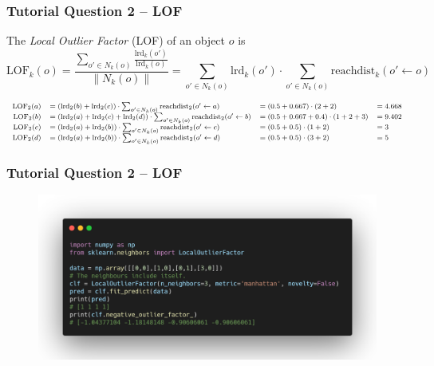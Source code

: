 \documentclass[aspectratio=169, 10pt]{beamer}
\newcommand{\norm}[1]{\left\lVert#1\right\rVert}
\begin{document}
\begin{frame}[t]
    \frametitle{Tutorial Question 2 -- LOF}
    
    The {\em Local Outlier Factor} (LOF) of an object $o$ is
    \[
        \text{LOF}_k(o) = \frac{\sum_{o' \in N_k(o)} \frac{\text{lrd}_k(o')}{\text{lrd}_k(o)}}{\norm{N_k(o)}} 
        = \sum_{o' \in N_k(o)} \text{lrd}_k(o') \cdot \sum_{o' \in N_k(o)} \text{reachdist}_k(o' \leftarrow o)
        \]
        
        \begin{equation*}
        \footnotesize
        \begin{array}{rlll}
            \text{LOF}_2(a) & = (\text{lrd}_2(b) + \text{lrd}_2(c)) \cdot \sum_{o' \in N_k(o)} \text{reachdist}_2(o' \leftarrow a) & = (0.5+0.667)\cdot (2+2)& = 4.668\\
            \text{LOF}_2(b) & = (\text{lrd}_2(a) + \text{lrd}_2(c) + \text{lrd}_2(d)) \cdot \sum_{o' \in N_k(o)} \text{reachdist}_2(o' \leftarrow b) & = (0.5+0.667+0.4) \cdot (1+2+3)& = 9.402\\
            \text{LOF}_2(c) & = (\text{lrd}_2(a) + \text{lrd}_2(b)) \cdot \sum_{o' \in N_k(o)} \text{reachdist}_2(o' \leftarrow c) & = (0.5+0.5) \cdot (1+2)& = 3 \\
            \text{LOF}_2(d) & = (\text{lrd}_2(a) + \text{lrd}_2(b)) \cdot \sum_{o' \in N_k(o)} \text{reachdist}_2(o' \leftarrow d) & = (0.5+0.5) \cdot (3+2)& = 5 \\
        \end{array}
    \end{equation*}

\end{frame}

\begin{frame}
    \frametitle{Tutorial Question 2 -- LOF}
    
    \begin{figure}
        \centering
        \includegraphics[width=\textwidth]{../imgs/question2_lof_code.png}
    \end{figure}
\end{frame}
\end{document}
